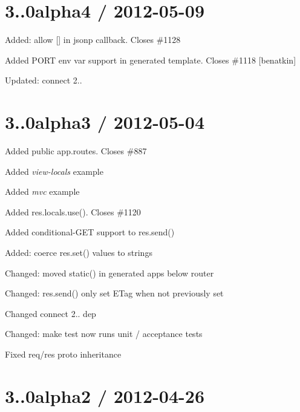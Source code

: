 {\ttfamily \section*{3..\+0alpha4 / 2012-\/05-\/09 }}

{\ttfamily }

{\ttfamily 
\begin{DoxyItemize}
\item Added\+: allow {\ttfamily \mbox{[}\mbox{]}} in jsonp callback. Closes \#1128
\item Added {\ttfamily P\+O\+RT} env var support in generated template. Closes \#1118 \mbox{[}benatkin\mbox{]}
\item Updated\+: connect 2..
\end{DoxyItemize}}

{\ttfamily \section*{3..\+0alpha3 / 2012-\/05-\/04 }}

{\ttfamily }

{\ttfamily 
\begin{DoxyItemize}
\item Added public {\ttfamily app.\+routes}. Closes \#887
\item Added {\itshape view-\/locals} example
\item Added {\itshape mvc} example
\item Added {\ttfamily res.\+locals.\+use()}. Closes \#1120
\item Added conditional-\/\+G\+ET support to {\ttfamily res.\+send()}
\item Added\+: coerce {\ttfamily res.\+set()} values to strings
\item Changed\+: moved {\ttfamily static()} in generated apps below router
\item Changed\+: {\ttfamily res.\+send()} only set E\+Tag when not previously set
\item Changed connect 2.. dep
\item Changed\+: {\ttfamily make test} now runs unit / acceptance tests
\item Fixed req/res proto inheritance
\end{DoxyItemize}}

{\ttfamily \section*{3..\+0alpha2 / 2012-\/04-\/26 }}

